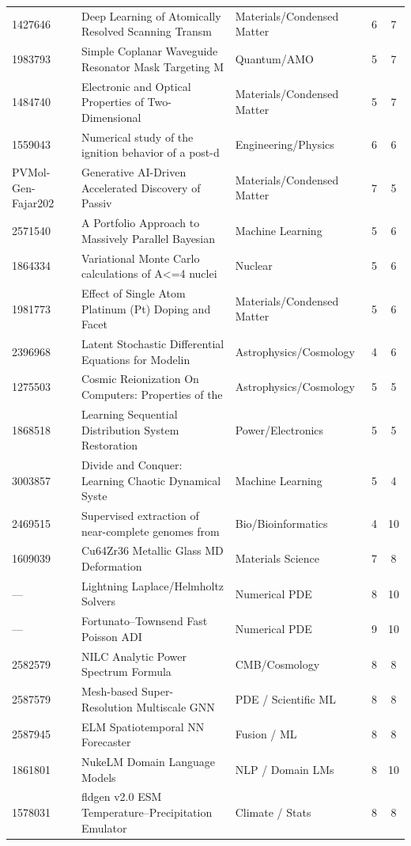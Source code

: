 \documentclass[11pt]{article}
\begin{document}
\begin{longtable}{lllcc}
1427646 & Deep Learning of Atomically Resolved Scanning Transm & Materials/Condensed Matter & 6 & 7 \\
1983793 & Simple Coplanar Waveguide Resonator Mask Targeting M & Quantum/AMO & 5 & 7 \\
1484740 & Electronic and Optical Properties of Two-Dimensional & Materials/Condensed Matter & 5 & 7 \\
1559043 & Numerical study of the ignition behavior of a post-d & Engineering/Physics & 6 & 6 \\
PVMol-Gen-Fajar202 & Generative AI-Driven Accelerated Discovery of Passiv & Materials/Condensed Matter & 7 & 5 \\
2571540 & A Portfolio Approach to Massively Parallel Bayesian  & Machine Learning & 5 & 6 \\
1864334 & Variational Monte Carlo calculations of A\textless{}=4 nuclei  & Nuclear & 5 & 6 \\
1981773 & Effect of Single Atom Platinum (Pt) Doping and Facet & Materials/Condensed Matter & 5 & 6 \\
2396968 & Latent Stochastic Differential Equations for Modelin & Astrophysics/Cosmology & 4 & 6 \\
1275503 & Cosmic Reionization On Computers: Properties of the  & Astrophysics/Cosmology & 5 & 5 \\
1868518 & Learning Sequential Distribution System Restoration  & Power/Electronics & 5 & 5 \\
3003857 & Divide and Conquer: Learning Chaotic Dynamical Syste & Machine Learning & 5 & 4 \\
2469515 & Supervised extraction of near-complete genomes from  & Bio/Bioinformatics & 4 & 10 \\
1609039 & Cu64Zr36 Metallic Glass MD Deformation & Materials Science & 7 & 8 \\
— & Lightning Laplace/Helmholtz Solvers & Numerical PDE & 8 & 10 \\
— & Fortunato--Townsend Fast Poisson ADI & Numerical PDE & 9 & 10 \\
2582579 & NILC Analytic Power Spectrum Formula & CMB/Cosmology & 8 & 8 \\
2587579 & Mesh-based Super-Resolution Multiscale GNN & PDE / Scientific ML & 8 & 8 \\
2587945 & ELM Spatiotemporal NN Forecaster & Fusion / ML & 8 & 8 \\
1861801 & NukeLM Domain Language Models & NLP / Domain LMs & 8 & 10 \\
1578031 & fldgen v2.0 ESM Temperature--Precipitation Emulator & Climate / Stats & 8 & 8 \\

\end{longtable}
\end{document}
